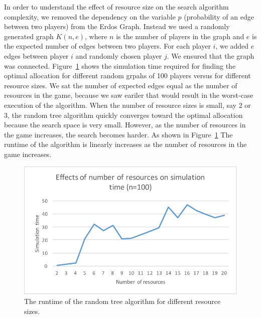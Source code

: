 In order to understand the effect of resource size on the search algorithm complexity, we removed the dependency on the variable $p$ (probability of an edge between two players) from the Erdos Graph. Instead we used a randomly generated graph $K(n, e)$, where $n$ is the number of players in the graph and $e$ is the expected number of edges between two players. For each player $i$, we added $e$ edges between player $i$ and randomly chosen player $j$. We ensured that the graph was connected. Figure~\ref{fig:result_time_resources} shows the simulation time required for finding the optimal allocation for different random grpahs of 100 players versus for different resource sizes. We sat the number of expected edges equal as the number of resources in the game, because we saw eariler that would result in the worst-case execution of the algorithm. When the number of resource sizes is small, say 2 or 3, the random tree algorithm quickly converges toward the optimal allocation because the search space is very small. However, as the number of resources in the game increases, the search becomes harder. As shown in Figure~\ref{fig:result_time_resources} The runtime of the algorithm is linearly increases as the number of resources in the game increases.

\begin{figure}[htb]
\begin{center}
\includegraphics[width=.4\textwidth]{result-time-resources}
\end{center}
\caption{The runtime of the random tree algorithm for different resource sizes.}
\label{fig:result_time_resources}
\end{figure}
